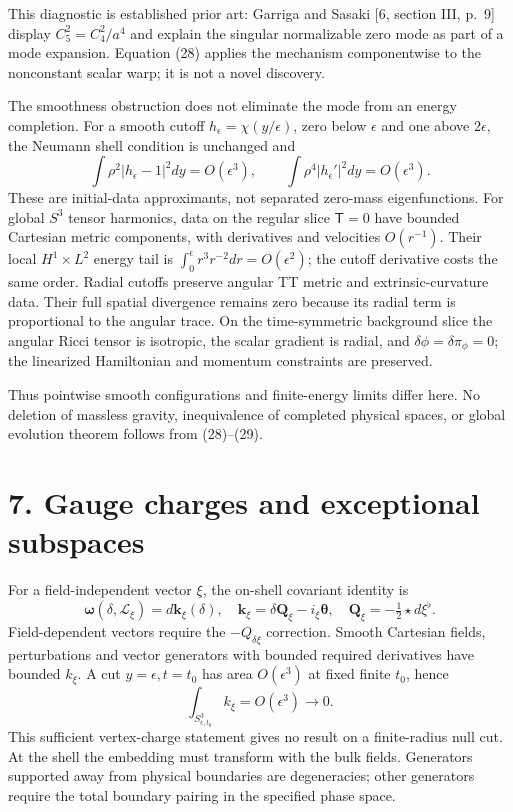 \documentclass[
  11pt,
]{article}
\begin{document}
This diagnostic is established prior art: Garriga and Sasaki {[}6,
section III, p.~9{]} display \(C_5^2=C_4^2/a^4\) and explain the
singular normalizable zero mode as part of a mode expansion. Equation
(28) applies the mechanism componentwise to the nonconstant scalar warp;
it is not a novel discovery.

The smoothness obstruction does not eliminate the mode from an energy
completion. For a smooth cutoff \(h_\epsilon=\chi(y/\epsilon)\), zero
below \(\epsilon\) and one above \(2\epsilon\), the Neumann shell
condition is unchanged and \[
 \int\rho^2|h_\epsilon-1|^2dy=O(\epsilon^3),\qquad
 \int\rho^4|h_\epsilon'|^2dy=O(\epsilon^3).            \tag{29}
\] These are initial-data approximants, not separated zero-mass
eigenfunctions. For global \(S^3\) tensor harmonics, data on the regular
slice \(\mathsf T=0\) have bounded Cartesian metric components, with
derivatives and velocities \(O(r^{-1})\). Their local \(H^1\times L^2\)
energy tail is \(\int_0^\epsilon r^3r^{-2}dr=O(\epsilon^2)\); the cutoff
derivative costs the same order. Radial cutoffs preserve angular TT
metric and extrinsic-curvature data. Their full spatial divergence
remains zero because its radial term is proportional to the angular
trace. On the time-symmetric background slice the angular Ricci tensor
is isotropic, the scalar gradient is radial, and
\(\delta\phi=\delta\pi_\phi=0\); the linearized Hamiltonian and momentum
constraints are preserved.

Thus pointwise smooth configurations and finite-energy limits differ
here. No deletion of massless gravity, inequivalence of completed
physical spaces, or global evolution theorem follows from (28)--(29).

\section{7. Gauge charges and exceptional
subspaces}\label{gauge-charges-and-exceptional-subspaces}

For a field-independent vector \(\xi\), the on-shell covariant identity
is \[
 \boldsymbol\omega(\delta,\mathcal L_\xi)
 =d\boldsymbol k_\xi(\delta),\quad
 \boldsymbol k_\xi=\delta\boldsymbol Q_\xi-i_\xi\boldsymbol\theta,
 \quad \boldsymbol Q_\xi=-\tfrac12\star d\xi^\flat.     \tag{30}
\] Field-dependent vectors require the \(-Q_{\delta\xi}\) correction.
Smooth Cartesian fields, perturbations and vector generators with
bounded required derivatives have bounded \(k_\xi\). A cut
\(y=\epsilon,t=t_0\) has area \(O(\epsilon^3)\) at fixed finite \(t_0\),
hence \[
 \int_{S^3_{\epsilon,t_0}}k_\xi=O(\epsilon^3)\to0.      \tag{31}
\] This sufficient vertex-charge statement gives no result on a
finite-radius null cut. At the shell the embedding must transform with
the bulk fields. Generators supported away from physical boundaries are
degeneracies; other generators require the total boundary pairing in the
specified phase space.
\end{document}
